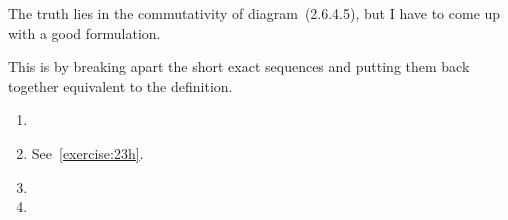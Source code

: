 \begin{exercise} %
  The truth lies in the commutativity of diagram~(2.6.4.5), but I have to come up with a good formulation.
\end{exercise}

\begin{exercise}
  This is by breaking apart the short exact sequences and putting them back together equivalent to the definition.
\end{exercise}

\begin{exercise} %
  \begin{enumerate}
    \item 

    \item See~\autoref{exercise:23h}.

    \item 

    \item 
  \end{enumerate}
\end{exercise}
